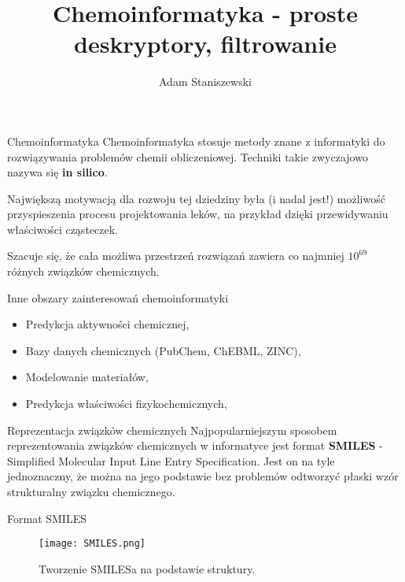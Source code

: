\documentclass{beamer}
\title{Chemoinformatyka - proste deskryptory, filtrowanie}
\author{Adam Staniszewski}
\date{}
\begin{document}
\maketitle

\begin{frame}{Chemoinformatyka}
Chemoinformatyka stosuje metody znane z informatyki do rozwiązywania problemów chemii obliczeniowej. Techniki takie zwyczajowo nazywa się \textbf{in silico}.

\hfill

Największą motywacją dla rozwoju tej dziedziny była (i nadal jest!) możliwość przyspieszenia procesu projektowania leków, na przykład dzięki przewidywaniu właściwości cząsteczek.

\hfill

Szacuje się, że cała możliwa przestrzeń rozwiązań zawiera co najmniej \textbf{$10^{69}$} różnych związków chemicznych.
\end{frame}

\begin{frame}{Inne obszary zainteresowań chemoinformatyki}
\begin{itemize}
    \item Predykcja aktywności chemicznej,
    \item Bazy danych chemicznych (PubChem, ChEBML, ZINC),
    \item Modelowanie materiałów,
    \item Predykcja właściwości fizykochemicznych,
\end{itemize}
\end{frame}

\begin{frame}{Reprezentacja związków chemicznych}
Najpopularniejszym sposobem reprezentowania związków chemicznych w informatyce jest format \textbf{SMILES} - Simplified Molecular Input Line Entry Specification. Jest on na tyle jednoznaczny, że można na jego podstawie bez problemów odtworzyć płaski wzór strukturalny związku chemicznego.
\end{frame}

\begin{frame}{Format SMILES}
\begin{figure}
    \centering
    \texttt{[image: SMILES.png]}
    \caption{Tworzenie SMILESa na podstawie struktury. }
    \label{fig:enter-label}
\end{figure}
\end{frame}
\end{document}
